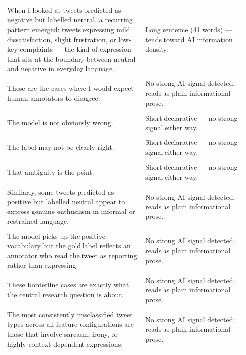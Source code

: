 \documentclass[11pt]{article}
\begin{document}
\begin{longtable}{|p{0.55\linewidth}|p{0.40\linewidth}|}
\hline
\rule{0pt}{3.5cm} & \\
\hline
When I looked at tweets predicted as negative but labelled neutral, a recurring pattern emerged: tweets expressing mild dissatisfaction, slight frustration, or low-key complaints --- the kind of expression that sits at the boundary between neutral and negative in everyday language. & Long sentence (41 words) --- tends toward AI information density. \\[2pt]
\hline
\rule{0pt}{3.5cm} & \\
\hline
These are the cases where I would expect human annotators to disagree. & No strong AI signal detected; reads as plain informational prose. \\[2pt]
\hline
\rule{0pt}{3.5cm} & \\
\hline
The model is not obviously wrong. & Short declarative --- no strong signal either way. \\[2pt]
\hline
\rule{0pt}{3.5cm} & \\
\hline
The label may not be clearly right. & Short declarative --- no strong signal either way. \\[2pt]
\hline
\rule{0pt}{3.5cm} & \\
\hline
That ambiguity is the point. & Short declarative --- no strong signal either way. \\[2pt]
\hline
\rule{0pt}{3.5cm} & \\
\hline
Similarly, some tweets predicted as positive but labelled neutral appear to express genuine enthusiasm in informal or restrained language. & No strong AI signal detected; reads as plain informational prose. \\[2pt]
\hline
\rule{0pt}{3.5cm} & \\
\hline
The model picks up the positive vocabulary but the gold label reflects an annotator who read the tweet as reporting rather than expressing. & No strong AI signal detected; reads as plain informational prose. \\[2pt]
\hline
\rule{0pt}{3.5cm} & \\
\hline
These borderline cases are exactly what the central research question is about. & No strong AI signal detected; reads as plain informational prose. \\[2pt]
\hline
\rule{0pt}{3.5cm} & \\
\hline
The most consistently misclassified tweet types across all feature configurations are those that involve sarcasm, irony, or highly context-dependent expressions. & No strong AI signal detected; reads as plain informational prose. \\[2pt]

\end{longtable}
\end{document}
